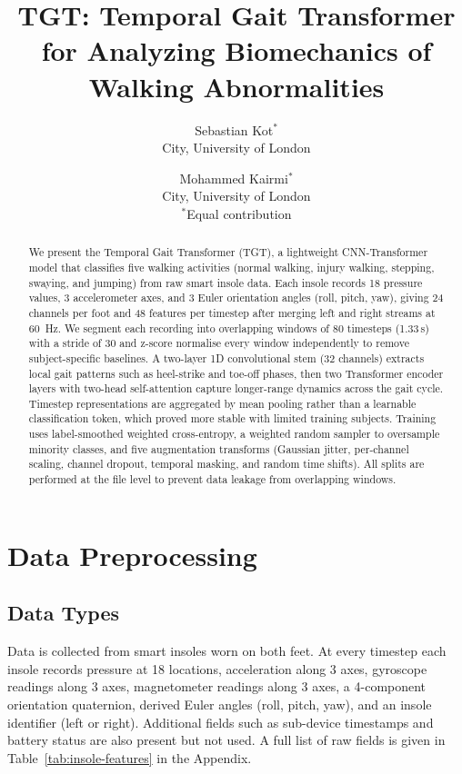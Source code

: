 \documentclass[11pt,a4paper,twocolumn]{article}
\title{TGT: Temporal Gait Transformer for Analyzing Biomechanics of Walking Abnormalities}
\author{%
  Sebastian Kot$^{*}$ \\ \small City, University of London
  \and
  Mohammed Kairmi$^{*}$ \\ \small City, University of London \\[6pt]
  \small $^{*}$Equal contribution
}
\date{}
\begin{document}
\maketitle

\begin{abstract}
We present the Temporal Gait Transformer (TGT), a lightweight CNN-Transformer model that classifies five walking activities (normal walking, injury walking, stepping, swaying, and jumping) from raw smart insole data. Each insole records 18 pressure values, 3 accelerometer axes, and 3 Euler orientation angles (roll, pitch, yaw), giving 24 channels per foot and 48 features per timestep after merging left and right streams at \SI{60}{Hz}. We segment each recording into overlapping windows of 80 timesteps (1.33\,s) with a stride of 30 and z-score normalise every window independently to remove subject-specific baselines. A two-layer 1D convolutional stem (32 channels) extracts local gait patterns such as heel-strike and toe-off phases, then two Transformer encoder layers with two-head self-attention capture longer-range dynamics across the gait cycle. Timestep representations are aggregated by mean pooling rather than a learnable classification token, which proved more stable with limited training subjects. Training uses label-smoothed weighted cross-entropy, a weighted random sampler to oversample minority classes, and five augmentation transforms (Gaussian jitter, per-channel scaling, channel dropout, temporal masking, and random time shifts). All splits are performed at the file level to prevent data leakage from overlapping windows.
\end{abstract}

\section{Data Preprocessing}

\subsection{Data Types}
Data is collected from smart insoles worn on both feet. At every timestep each insole records pressure at 18 locations, acceleration along 3 axes, gyroscope readings along 3 axes, magnetometer readings along 3 axes, a 4-component orientation quaternion, derived Euler angles (roll, pitch, yaw), and an insole identifier (left or right). Additional fields such as sub-device timestamps and battery status are also present but not used. A full list of raw fields is given in Table~\ref{tab:insole-features} in the Appendix.
\end{document}
